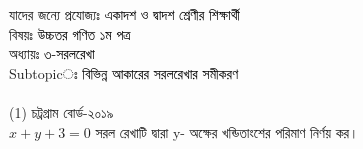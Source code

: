 \documentclass{article}
\begin{document}
 
	\Large
	যাদের জন্যে প্রযোজ্যঃ  	\textcolor{black}{একাদশ ও দ্বাদশ শ্রেণীর শিক্ষার্থী} \\
বিষয়ঃ \textcolor{black}{উচ্চতর গণিত ১ম পত্র} \\
অধ্যায়ঃ \textcolor{black}{৩-সরলরেখা }\\ 
Subtopicঃ \textcolor{black}{ বিভিন্ন আকারের সরলরেখার সমীকরণ }\\	
\\
(1) চট্রগ্রাম বোর্ড-২০১৯\\
$x+y+3=0$ সরল রেখাটি দ্বারা y- অক্ষের খন্ডিতাংশের পরিমাণ নির্ণয় কর। \\
\end{document}
